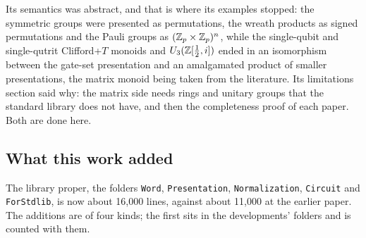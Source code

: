 Its semantics was abstract, and that is where its examples stopped: the
symmetric groups were presented as permutations, the wreath products
as signed permutations and the Pauli groups as $(\mathbb{Z}_p\times\mathbb{Z}_p)^n$,
while the single-qubit and single-qutrit Clifford+$T$ monoids and
$U_3(\mathbb{Z}[\frac12,i])$ ended in an isomorphism between the gate-set
presentation and an amalgamated product of smaller presentations, the
matrix monoid being taken from the literature. Its limitations section
said why: the matrix side needs rings and unitary groups that the
standard library does not have, and then the completeness proof of
each paper. Both are done here.

\subsection{What this work added}\label{sec:extensions}

The library proper, the folders \texttt{Word}, \texttt{Presentation},
\texttt{Normalization}, \texttt{Circuit} and \texttt{ForStdlib}, is
now about 16{,}000 lines, against about 11{,}000 at the earlier paper.
The additions are of four kinds; the first sits in the developments'
folders and is counted with them.

